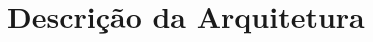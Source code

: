 \documentclass{report}
\begin{document}
	
	
	
	
	

\chapter{Descrição da Arquitetura}

	
	\newpage
	
	\newpage
		
	\newpage
	

% 
% 
\end{document}
